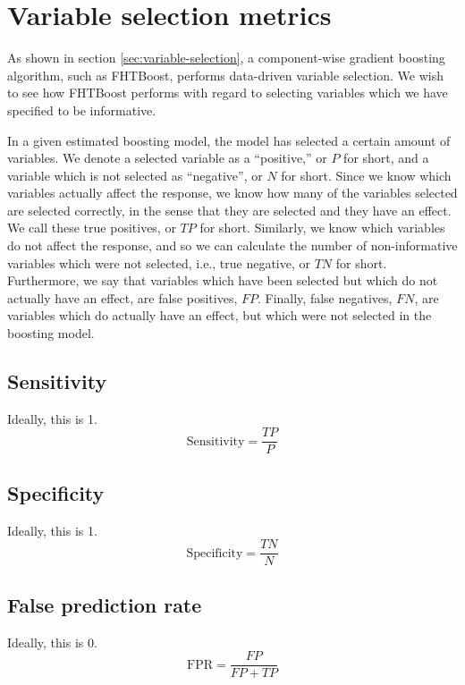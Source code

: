 \section{Variable selection metrics}
As shown in section \eqref{sec:variable-selection}, a component-wise gradient boosting algorithm, such as FHTBoost,
performs data-driven variable selection.
We wish to see how FHTBoost performs with regard to selecting variables which we have specified to be informative.

In a given estimated boosting model, the model has selected a certain amount of variables.
We denote a selected variable as a ``positive,'' or $P$ for short, and a variable which is not selected as ``negative'', or $N$ for short.
Since we know which variables actually affect the response, we know how many of the variables selected are selected correctly, in the sense
that they are selected and they have an effect. We call these true positives, or $TP$ for short.
Similarly, we know which variables do not affect the response, and so we can calculate the number of non-informative variables
which were not selected, i.e., true negative, or $TN$ for short. Furthermore, we say that variables which have been selected
but which do not actually have an effect, are false positives, $FP$. Finally, false negatives, $FN$, are variables which do actually
have an effect, but which were not selected in the boosting model.

\subsection{Sensitivity}
Ideally, this is 1.
\begin{equation}\label{eq:sensitivity}
    \text{Sensitivity}=\frac{TP}{P}
\end{equation}

\subsection{Specificity}
Ideally, this is 1.
\begin{equation}\label{eq:specificity}
    \text{Specificity}=\frac{TN}{N}
\end{equation}

\subsection{False prediction rate}
Ideally, this is 0.
\begin{equation}\label{eq:accuracy}
    \text{FPR}=\frac{FP}{FP+TP}
\end{equation}


